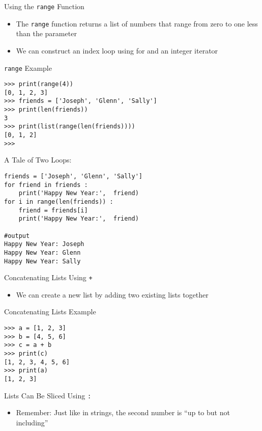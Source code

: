 \documentclass[serif, aspectratio=169]{beamer}
\begin{document}
\begin{frame}{Using the \texttt{range} Function}
    \begin{itemize}
        \item The \texttt{\color{red}range} function returns a list of numbers that range from zero to one less than the parameter
        \item We can construct an index loop using for and an integer iterator
    \end{itemize}
\end{frame}

\begin{frame}[fragile]{\texttt{range} Example}
    \begin{lstlisting}
>>> print(range(4))
[0, 1, 2, 3]
>>> friends = ['Joseph', 'Glenn', 'Sally']
>>> print(len(friends))
3
>>> print(list(range(len(friends))))
[0, 1, 2]
>>> 
    \end{lstlisting}
\end{frame}

\begin{frame}[fragile]{A Tale of Two Loops:}
    \begin{lstlisting}
friends = ['Joseph', 'Glenn', 'Sally']
for friend in friends :
    print('Happy New Year:',  friend)
for i in range(len(friends)) :
    friend = friends[i]
    print('Happy New Year:',  friend)

#output 
Happy New Year: Joseph
Happy New Year: Glenn
Happy New Year: Sally
    \end{lstlisting}
\end{frame}

\begin{frame}{Concatenating Lists Using \texttt{+}}
    \begin{itemize}
        \item We can create a new list by adding two existing lists together
    \end{itemize}
\end{frame}

\begin{frame}[fragile]{Concatenating Lists Example}
    \begin{lstlisting}
>>> a = [1, 2, 3]
>>> b = [4, 5, 6]
>>> c = a + b
>>> print(c)
[1, 2, 3, 4, 5, 6]
>>> print(a)
[1, 2, 3]
    \end{lstlisting}
\end{frame}

\begin{frame}{Lists Can Be Sliced Using \texttt{:}}
    \begin{itemize}
        \item Remember: Just like in strings, the second number is “up to but not including”
    \end{itemize}
\end{frame}
\end{document}
